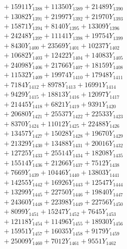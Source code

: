 \documentclass[a4paper,10pt]{article}
\begin{document}
{\begin{align}
&\;  + 15911 Y_{1388} + 11350 Y_{1389} + 21489 Y_{1390} \\[0.3ex]
&\;  + 13082 Y_{1391} + 21997 Y_{1392} + 21970 Y_{1393} \\[0.3ex]
&\;  + 15871 Y_{1394} + 8140 Y_{1395} + 13309 Y_{1396} \\[0.3ex]
&\;  + 24248 Y_{1397} + 11141 Y_{1398} + 19754 Y_{1399} \\[0.3ex]
&\;  + 8430 Y_{1400} + 23569 Y_{1401} + 10237 Y_{1402} \\[0.3ex]
&\;  + 10682 Y_{1403} + 12422 Y_{1404} + 14083 Y_{1405} \\[0.3ex]
&\;  + 24098 Y_{1406} + 21766 Y_{1407} + 18159 Y_{1408} \\[0.5ex]\allowbreak
&\;  + 11532 Y_{1409} + 19974 Y_{1410} + 17948 Y_{1411} \\[0.3ex]
&\;  + 7184 Y_{1412} + 8978 Y_{1413} + 16991 Y_{1414} \\[0.3ex]
&\;  + 9429 Y_{1415} + 18813 Y_{1416} + 12097 Y_{1417} \\[0.3ex]
&\;  + 21445 Y_{1418} + 6821 Y_{1419} + 9391 Y_{1420} \\[0.3ex]
&\;  + 20680 Y_{1421} + 25537 Y_{1422} + 22533 Y_{1423} \\[0.3ex]
&\;  + 8370 Y_{1424} + 11012 Y_{1425} + 22488 Y_{1426} \\[0.3ex]
&\;  + 13457 Y_{1427} + 15028 Y_{1428} + 19670 Y_{1429} \\[0.3ex]
&\;  + 21329 Y_{1430} + 13488 Y_{1431} + 20016 Y_{1432} \\[0.3ex]
&\;  + 12725 Y_{1433} + 25514 Y_{1434} + 18208 Y_{1435} \\[0.3ex]
&\;  + 15514 Y_{1436} + 21266 Y_{1437} + 7512 Y_{1438} \\[0.5ex]\allowbreak
&\;  + 7669 Y_{1439} + 10446 Y_{1440} + 13803 Y_{1441} \\[0.3ex]
&\;  + 14255 Y_{1442} + 16926 Y_{1443} + 12547 Y_{1444} \\[0.3ex]
&\;  + 13299 Y_{1445} + 22750 Y_{1446} + 19840 Y_{1447} \\[0.3ex]
&\;  + 24360 Y_{1448} + 22398 Y_{1449} + 22756 Y_{1450} \\[0.3ex]
&\;  + 8099 Y_{1451} + 15247 Y_{1452} + 7645 Y_{1453} \\[0.3ex]
&\;  + 12118 Y_{1454} + 11496 Y_{1455} + 18930 Y_{1456} \\[0.3ex]
&\;  + 15951 Y_{1457} + 16035 Y_{1458} + 9179 Y_{1459} \\[0.3ex]
&\;  + 25009 Y_{1460} + 7012 Y_{1461} + 9551 Y_{1462} \\[0.3ex]

\end{align}}
\end{document}
